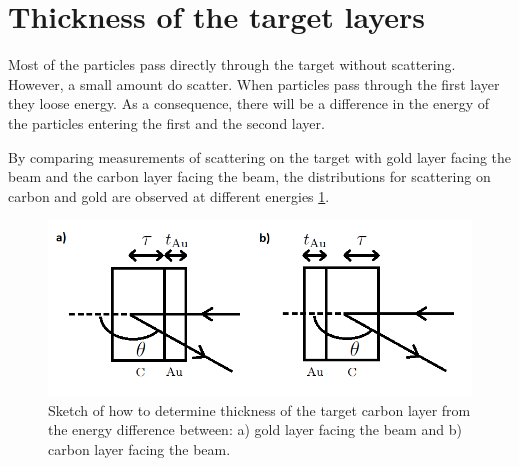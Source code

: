 \section{Thickness of the target layers} 
Most of the particles pass directly through the target without scattering. However, a small amount do scatter. When particles pass through the first layer they loose energy. As a consequence, there will be a difference in the energy of the particles entering the first and the second layer. 

By comparing measurements of scattering on the target with gold layer facing the beam and the carbon layer facing the beam, the distributions for scattering on carbon and gold are observed at different energies \cref{fig_sketch_thickness}. 

\begin{figure}[h]
\centering
\includegraphics[width=0.99\columnwidth]{tykkelse.png}
\caption{Sketch of how to determine thickness of the target carbon layer from the energy difference between: a) gold layer facing the beam and b) carbon layer facing the beam.}
\label{fig_sketch_thickness}
\end{figure}

